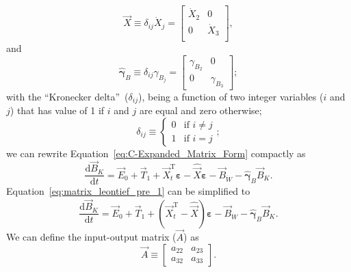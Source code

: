 %
\begin{equation} \label{eq:X_hat_matrix_def}
	\hat{\vec{X}} 
	\equiv
	\delta_{ij} \dot{X}_{j} 
	= 
	\begin{bmatrix}
		\dot{X}_{2}		&	0	  \\
		0				&	\dot{X}_{3}	\\
	\end{bmatrix},
\end{equation} 
%
and
%
\begin{equation} \label{eq:gamma_hat_matrix_def}
	\hat{\boldsymbol{\gamma}}_{B}
	\equiv
	\delta_{ij} \gamma_{B_{j}}
	=
	\begin{bmatrix}
		\gamma_{B_{2}} & 0         \\
		0              & \gamma_{B_{3}}
	\end{bmatrix};
\end{equation}
%
with the ``Kronecker delta''~($\delta_{ij}$),
being a function of two integer variables ($i$ and $j$)
that has value of 1 if $i$ and $j$ are equal and zero otherwise;
%
\begin{equation}\label{eq:k_delta}
	\delta_{ij} 
	\equiv
	\begin{cases}	
		0	&	\text{if  } i \neq j	\\
		1 	& 	\text{if  } i = j
	\end{cases};
\end{equation}
%
we can rewrite Equation~\ref{eq:C-Expanded_Matrix_Form}
compactly as
%
\begin{equation} \label{eq:matrix_leontief_pre_1}
	\frac{\mathrm{d}\vec{B}_{K}}{\mathrm{d}t} 
	= \vec{E}_{0}
	+ \vec{T}_{1}
	+ \vec{X}_{t}^{\mathrm{T}}\boldsymbol{\varepsilon} 
	- \hat{\vec{X}}\boldsymbol{\varepsilon}
	- \vec{B}_{\dot{W}}
	- \hat{\boldsymbol{\gamma}}_{B} \vec{B}_{K}.
\end{equation}
%
Equation~\ref{eq:matrix_leontief_pre_1} can be simplified to
%
\begin{equation} \label{eq:matrix_leontief_pre_2}
	\frac{\mathrm{d}\vec{B}_{K}}{\mathrm{d}t} 
	= \vec{E}_{0}
	+ \vec{T}_{1}
	+ (\vec{X}_{t}^{\mathrm{T}} - \hat{\vec{X}})\boldsymbol{\varepsilon} 
	- \vec{B}_{\dot{W}}
	- \hat{\boldsymbol{\gamma}}_{B}\vec{B}_{K}.
\end{equation}
%
We can define the input-output matrix ($\vec{A}$) as
%
\begin{equation} \label{eq:A_matrix_def}
	\vec{A} 
	\equiv
	\begin{bmatrix}
		a_{22} & a_{23}	\\
		a_{32} & a_{33}	
	\end{bmatrix}.
\end{equation}
